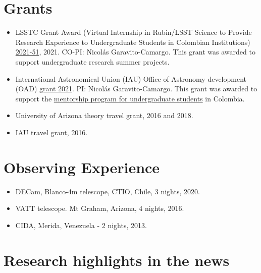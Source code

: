 \documentclass[14pt]{article}
\begin{document}
\section*{Grants}
\begin{itemize}
\setlength\itemsep{0.0em}
\renewcommand\labelitemi{$\cdot$}
\item LSSTC Grant Award (Virtual Internship in Rubin/LSST Science to Provide Research Experience to Undergraduate Students in Colombian Institutions)
  \href{https://lsstdiscoveryalliance.org/programs/science-catalyst-grants/2021/}{2021-51},
  2021. CO-PI: Nicol\'as Garavito-Camargo. This grant was awarded to support undergraduate research summer projects. 
\item International Astronomical Union (IAU) Office of Astronomy development
  (OAD)
  \href{https://www.astro4dev.org/category/a-virtual-community-mentorship-program-for-development-in-colombia/}{grant
  2021}. PI: Nicol\'as Garavito-Camargo. This grant was awarded to support the \href{https://www.astroreca.org/en/mentoring}{mentorship program for undergraduate students} in Colombia. 
\item University of Arizona theory travel grant, 2016 and 2018. 
\item IAU travel grant, 2016.
\end{itemize}

\section*{Observing Experience}
\begin{itemize}
  \setlength\itemsep{0.0em}
  \renewcommand\labelitemi{$\cdot$}
    \item DECam, Blanco-4m telescope, CTIO, Chile, 3 nights, 2020.
    \item VATT telescope. Mt Graham, Arizona, 4 nights, 2016.
    \item CIDA, Merida, Venezuela - 2 nights, 2013.
\end{itemize}


\section*{Research highlights in the news}
\end{document}
